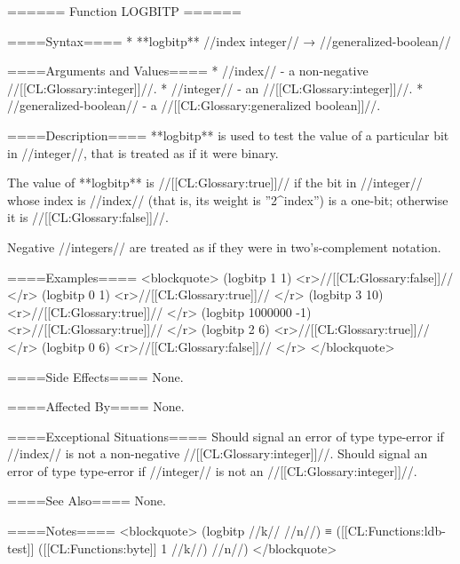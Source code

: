 ====== Function LOGBITP ======

====Syntax====
  * **logbitp** //index integer// → //generalized-boolean//

====Arguments and Values====
  * //index// - a non-negative //[[CL:Glossary:integer]]//.
  * //integer// - an //[[CL:Glossary:integer]]//.
  * //generalized-boolean// - a //[[CL:Glossary:generalized boolean]]//.

====Description====
**logbitp** is used to test the value of a particular bit in //integer//, that is treated as if it were binary.

The value of **logbitp** is //[[CL:Glossary:true]]// if the bit in //integer// whose index is //index// (that is, its weight is ''2^index'') is a one-bit; otherwise it is //[[CL:Glossary:false]]//.

Negative //integers// are treated as if they were in two's-complement notation.

====Examples==== 
<blockquote> 
(logbitp 1 1) <r>//[[CL:Glossary:false]]// </r>
(logbitp 0 1) <r>//[[CL:Glossary:true]]// </r>
(logbitp 3 10) <r>//[[CL:Glossary:true]]// </r>
(logbitp 1000000 -1) <r>//[[CL:Glossary:true]]// </r>
(logbitp 2 6) <r>//[[CL:Glossary:true]]// </r>
(logbitp 0 6) <r>//[[CL:Glossary:false]]// </r>
</blockquote>

====Side Effects====
None.

====Affected By====
None.

====Exceptional Situations====
Should signal an error of type type-error if //index// is not a non-negative //[[CL:Glossary:integer]]//. Should signal an error of type type-error if //integer// is not an //[[CL:Glossary:integer]]//.

====See Also====
None.

====Notes====
<blockquote> 
(logbitp //k// //n//) ≡ ([[CL:Functions:ldb-test]] ([[CL:Functions:byte]] 1 //k//) //n//) 
</blockquote>

